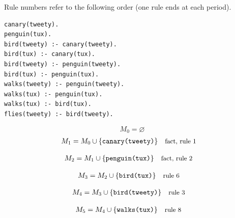 \documentclass[a4paper,11pt]{article}
\newif\ifexplain
\newcommand{\explain}[1]{\ifexplain\begin{erklbox}#1\end{erklbox}\fi}
\newcommand{\why}[1]{\text{\small #1}}
\newcommand{\at}[1]{\texttt{#1}}
\begin{document}
Rule numbers refer to the following order (one rule ends at each period).
\begin{small}
\begin{verbatim}
canary(tweety).
penguin(tux).
bird(tweety) :- canary(tweety).
bird(tux) :- canary(tux).
bird(tweety) :- penguin(tweety).
bird(tux) :- penguin(tux).
walks(tweety) :- penguin(tweety).
walks(tux) :- penguin(tux).
walks(tux) :- bird(tux).
flies(tweety) :- bird(tweety).
\end{verbatim}
\end{small}
\explain{Beim Redukt bleibt die Kandidatenmenge fest. Wir entscheiden zuerst, welche Regeln wegfallen. Erst danach berechnen wir aus den verbleibenden positiven Regeln die kleinste abgeschlossene Menge. Ein Modell allein reicht nicht: Diese Menge muss genau der Kandidat sein.}
\[
M_0=\varnothing
\]
\begin{align*}
M_{1} &= M_{0}\cup \{\at{canary(tweety)}\} && \why{fact, rule 1}
\end{align*}
\explain{Diese Regel hat keinen Körper. Ihr Kopf $\at{canary(tweety)}$ ist damit ein Fakt und muss in die Menge.}
\begin{align*}
M_{2} &= M_{1}\cup \{\at{penguin(tux)}\} && \why{fact, rule 2}
\end{align*}
\explain{Diese Regel hat keinen Körper. Ihr Kopf $\at{penguin(tux)}$ ist damit ein Fakt und muss in die Menge.}
\begin{align*}
M_{3} &= M_{2}\cup \{\at{bird(tux)}\} && \why{rule 6}
\end{align*}
\explain{Für $\at{bird(tux)}$ brauchen wir $\at{penguin(tux)}$. Weil diese Voraussetzungen bereits hergeleitet sind, dürfen wir den Regelkopf jetzt aufnehmen und alle bisherigen Atome behalten; bei einer fehlenden Voraussetzung würde diese Regel dagegen noch nichts beitragen.}
\begin{align*}
M_{4} &= M_{3}\cup \{\at{bird(tweety)}\} && \why{rule 3}
\end{align*}
\explain{Für $\at{bird(tweety)}$ brauchen wir $\at{canary(tweety)}$. Weil diese Voraussetzungen bereits hergeleitet sind, dürfen wir den Regelkopf jetzt aufnehmen und alle bisherigen Atome behalten; bei einer fehlenden Voraussetzung würde diese Regel dagegen noch nichts beitragen.}
\begin{align*}
M_{5} &= M_{4}\cup \{\at{walks(tux)}\} && \why{rule 8}
\end{align*}
\explain{Für $\at{walks(tux)}$ brauchen wir $\at{penguin(tux)}$. Weil diese Voraussetzungen bereits hergeleitet sind, dürfen wir den Regelkopf jetzt aufnehmen und alle bisherigen Atome behalten; bei einer fehlenden Voraussetzung würde diese Regel dagegen noch nichts beitragen.}
\end{document}
